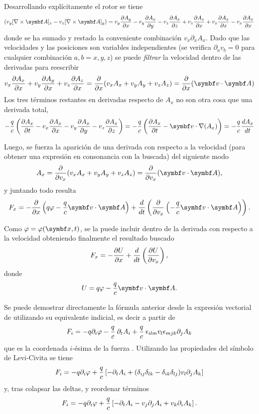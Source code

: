 \documentclass[10pt,oneside]{CBFT_book}
\begin{document}
Desarrollando explícitamente el rotor se tiene 
\[
	\left( v_y [\rotorm{A}]_z - v_z [\rotorm{A}]_y \right) = 
	v_y \dpar{A_y}{x} - v_y \dpar{A_x}{y} - v_z \dpar{A_x}{z} + v_z \dpar{A_z}{x} + v_x \dpar{A_x}{x} - v_x \dpar{A_x}{x}
\]
donde se ha sumado y restado la conveniente combinación $ v_x \partial_x A_x $. Dado que las velocidades y las posiciones son variables
independientes (se verifica $ \partial_a v_b = 0 $ para cualquier combinación $ a,b=x,y,z $) se puede {\it filtrar} la velocidad dentro
de las derivadas para reescribir 
\[
	v_x \dpar{A_x}{x} + v_y \dpar{A_y}{x} + v_z \dpar{A_z}{x} = \dpar{}{x}( v_xA_x + v_yA_y + v_zA_z ) = \dpar{}{x}( \pe{v}{A} )
\]
Los tres términos restantes en derivadas respecto de $A_x$ no son otra cosa que una derivada total,
\[
	- \frac{q}{c} \left(  \dpar{ A_x }{t}- v_x\dpar{ A_x}{x} - v_y\dpar{A_x}{y} - v_z\dpar{A_x}{z} \right) =
	- \frac{q}{c} \left( \dpar{ A_x }{t} - \vb{v}\cdot\nabla( A_x ) \right) = - \frac{q}{c} \dtot{A_x}{t}
\]

Luego, se fuerza la aparición de una derivada con respecto a la velocidad (para obtener una expresión en consonancia con la buscada)
del siguiente modo
\[
	A_x = \dpar{}{v_x}(v_xA_x + v_yA_y + v_zA_z) = \dpar{}{v_x}(\pe{v}{A}),
\]
y juntando todo resulta
\[
	F_x = -\dpar{ }{ x }\left( q\vp - \frac{q}{c} \pe{v}{A} \right) 
	+ \dtot{ }{t} \left( \dpar{}{v_x}\left( -\frac{q}{c}\pe{v}{A} \right) \right) .
\]

Como $\vp=\vp(\vb{x},t)$, se la puede incluir dentro de la derivada con respecto a la velocidad obteniendo finalmente el 
resultado buscado
\[
	F_x = -\frac{\partial^{\hspace{-0.05em}} { U }}{\partial { x }^{\hspace{-0.05em}}} + \frac{d^{\hspace{-0.05em}} { }}{d {t}^{\hspace{-0.05em}}}\left( \frac{\partial^{\hspace{-0.05em}} {U}}{\partial {v_x}^{\hspace{-0.05em}}} \right),
\]
donde 
\[
	U = q \vp - \frac{q}{c} \pe{v}{A}.
\]
 

Se puede demostrar directamente la fórmula anterior desde la expresión vectorial de  utilizando su equivalente 
indicial, es decir a partir de
\[
	F_i = -q \partial_i \varphi - \frac{q}{c} \:\partial_t A_i + \frac{q}{c} \: \epsilon_{ilm} v_l \epsilon_{mjk} 
	\partial_j A_k
\]
que es la coordenada $i$-ésima de la fuerza . Utilizando las propiedades del símbolo de Levi-Civita se tiene 
\[
	F_i = -q \partial_i \varphi + \frac{q}{c} \left[  -\partial_t A_i  + (\delta_{ij}\delta_{lk} - \delta_{ik}\delta_{lj}) v_l \partial_j A_k \right]
\]
y, tras colapsar las deltas, y reordenar términos
\[
	F_i = -q \partial_i \varphi + \frac{q}{c} \left[  -\partial_t A_i - v_j \partial_j A_i +  v_k \partial_i A_k  \right].
\]
\end{document}
